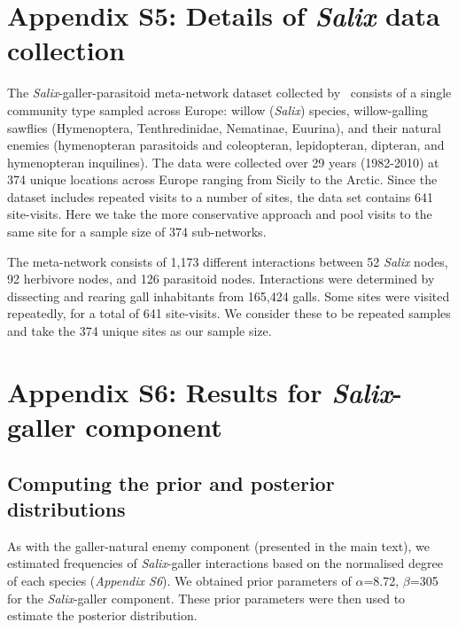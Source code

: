 \documentclass[12pt]{article}
\begin{document}
\clearpage

\section*{Appendix S5: Details of \emph{Salix} data collection}

      The \emph{Salix}-galler-parasitoid meta-network dataset collected 
      by~\citet{Kopelke2017} consists of a single community type sampled across 
      Europe: willow (\emph{Salix}) species, willow-galling sawflies (Hymenoptera, Tenthredinidae, Nematinae, Euurina), and their natural 
      enemies (hymenopteran parasitoids and coleopteran, lepidopteran, dipteran, 
      and hymenopteran inquilines). The data were collected over 29 years 
      (1982-2010) at 374 unique locations across Europe ranging from Sicily to 
      the Arctic. Since the dataset includes repeated visits to a number of sites, the data set 
      contains 641 site-visits. Here we take the more conservative approach and pool visits to the same site for a sample size of 374 sub-networks.

      The meta-network consists of 1,173 different interactions 
      between 52 \emph{Salix} nodes, 92 herbivore nodes, and 126 parasitoid 
      nodes. Interactions were determined by dissecting and rearing gall 
      inhabitants from 165,424 galls. Some sites were visited repeatedly, for a 
      total of 641 site-visits. We consider these to be repeated samples and 
      take the 374 unique sites as our sample size.

\clearpage

\section*{Appendix S6: Results for \emph{Salix}-galler component}

    \subsection*{Computing the prior and posterior distributions}

      As with the galler-natural enemy component (presented in the main text), we estimated frequencies of \emph{Salix}-galler interactions based on the normalised degree of each species (\emph{Appendix S6}). We obtained prior parameters of $\alpha$=8.72, $\beta$=305 for the \emph{Salix}-galler component. These prior parameters were then used to estimate the posterior distribution. 
\end{document}
